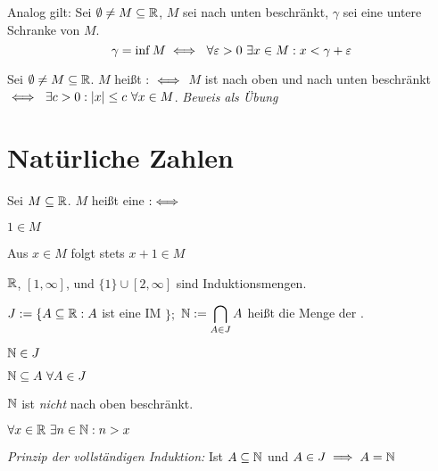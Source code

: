 \documentclass[a4paper,oneside,DIV15,BCOR12mm]{scrbook}
\begin{document}
Analog gilt: Sei $\emptyset \ne M \subseteq \mathbb{R}$, $M$ sei nach unten beschränkt, $\gamma$ sei eine untere Schranke von $M$.
\[ \gamma = \inf{M} \equizu \ \forall\varepsilon > 0 \ \exists x \in M: x < \gamma + \varepsilon \]

\begin{definition}
Sei $\emptyset \ne M \subseteq \mathbb{R}$. $M$ heißt : $\iff$ $M$ ist nach oben und nach unten beschränkt $\iff \ \exists c > 0: |x| \le c \ \forall x\in M$. \textit{Beweis als Übung}
\end{definition}

\chapter{Natürliche Zahlen}

\begin{definition}[Induktionsmengen]
Sei $M \subseteq \mathbb{R}$. $M$ heißt eine   $:\iff$
\begin{liste}
\item $1 \in M$
\item Aus $x \in M$ folgt stets $x+1 \in M$
\end{liste}
\end{definition}

\begin{beispiel} $\mathbb{R}$, $[1,\infty]$, und $\{1\} \cup [2,\infty]$ sind Induktionsmengen.

$J:=\{A \subseteq \mathbb{R}: A$ ist eine IM $\};$ $\mathbb{N} := \displaystyle\bigcap_{ A\in J} A$  heißt die Menge der .
\end{beispiel}

\begin{satz}[Induktionsmengen]
\begin{liste}
\item $\mathbb{N} \in J$
\item $\mathbb{N} \subseteq A \ \forall A \in J$
\item $\mathbb{N}$ ist \textit{nicht} nach oben beschränkt.
\item $\forall x  \in \mathbb{R} \ \exists n \in \mathbb{N}: n > x $
\item \textit{Prinzip der vollständigen Induktion:} Ist $A \subseteq \mathbb{N}$ und $A \in J\implies A = \mathbb{N}$
\end{liste}
\end{satz}
\end{document}
